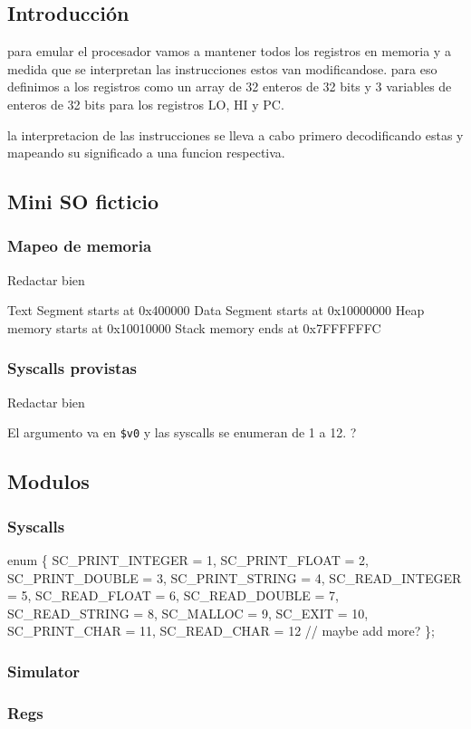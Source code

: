 \documentclass[12pt]{article}
\begin{document}
\subsection{Introducción}
para emular el procesador vamos a mantener todos los registros en memoria y a
medida que se interpretan las instrucciones estos van modificandose.
para eso definimos a los registros como un array de 32 enteros de 32 bits
y 3 variables de enteros de 32 bits para  los registros LO, HI y PC.

la interpretacion de las instrucciones se lleva a cabo primero decodificando
estas y mapeando su significado a una funcion respectiva.
\subsection{Mini SO ficticio}
\subsubsection{Mapeo de memoria}
Redactar bien

Text Segment starts at 0x400000
Data Segment starts at 0x10000000
Heap memory starts at 0x10010000
Stack memory ends at 0x7FFFFFFC
\subsubsection{Syscalls provistas}
Redactar bien

El argumento va en \texttt{\$v0} y las syscalls se enumeran de 1 a 12. ?

\subsection{Modulos}
\subsubsection{Syscalls}
enum \{
    SC\_PRINT\_INTEGER    = 1,
    SC\_PRINT\_FLOAT      = 2,
    SC\_PRINT\_DOUBLE     = 3,
    SC\_PRINT\_STRING     = 4,
    SC\_READ\_INTEGER     = 5,
    SC\_READ\_FLOAT       = 6,
    SC\_READ\_DOUBLE      = 7,
    SC\_READ\_STRING      = 8,
    SC\_MALLOC           = 9,
    SC\_EXIT             = 10,
    SC\_PRINT\_CHAR       = 11,
    SC\_READ\_CHAR        = 12
    // maybe add more?
\};
\subsubsection{Simulator}
\subsubsection{Regs}
\end{document}
